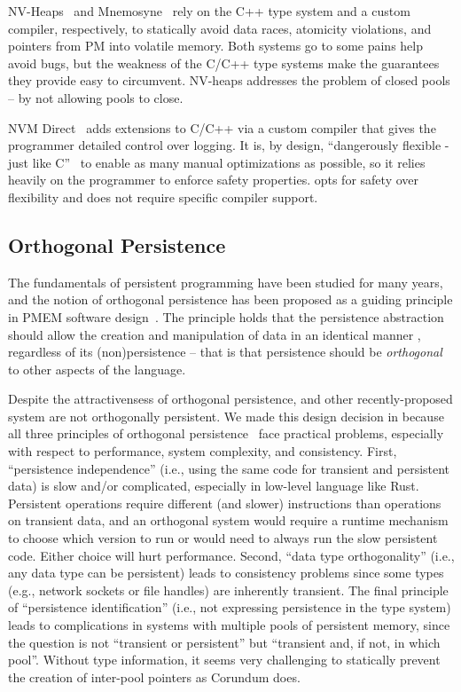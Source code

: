 NV-Heaps~\cite{nvheaps} and Mnemosyne~\cite{mnemosyne} rely on the C++ type system and a custom compiler, respectively, to statically avoid data races, atomicity violations, and pointers from PM into volatile memory.  Both systems go to some pains help avoid bugs, but the weakness of the C/C++ type systems make the guarantees they provide easy to circumvent.  NV-heaps addresses the problem of closed pools -- by not allowing pools to close.

NVM Direct~\cite{oracle-nvm-direct} adds extensions to C/C++ via a custom compiler that gives the programmer detailed control over logging.  It is, by design, ``dangerously flexible - just like C''~\cite{personalbillbridge} to enable as many manual optimizations as possible, so it relies heavily on the programmer to enforce safety properties.  \This{} opts for safety over flexibility and does not require specific compiler support.

\subsection{Orthogonal Persistence}

The fundamentals of persistent programming have been studied for many years,
and the notion of orthogonal persistence has been proposed as a guiding
principle in PMEM software design~\cite{atkinson1995orthogonally}.  The
principle holds that the persistence abstraction should allow the creation and
manipulation of data in an identical manner , regardless of its
(non)persistence -- that is that persistence should be \emph{orthogonal} to
other aspects of the language.


Despite the attractivensess of orthogonal persistence, \this{} and other
recently-proposed system are not orthogonally persistent.  We made this design
decision in \this{} because all three principles of orthogonal persistence~\cite{atkinson1995orthogonally} face practical
problems, especially with respect to performance, system complexity, and
consistency.  First, “persistence independence” (i.e., using the same code for
transient and persistent data) is slow and/or complicated, especially in
low-level language like Rust. Persistent operations require different (and
slower) instructions than operations on transient data, and an orthogonal
system would require a runtime mechanism to choose which version to run or
would need to always run the slow persistent code.  Either choice will hurt
performance.  Second, “data type orthogonality” (i.e., any data type can be persistent) leads to consistency problems
since some types (e.g., network sockets or file handles) are inherently
transient. The final principle of “persistence identification” (i.e., not
expressing persistence in the type system) leads to complications in systems
with multiple pools of persistent memory, since the question is not “transient
or persistent” but “transient and, if not, in which pool”.  Without type
information, it seems very challenging to statically prevent the creation of
inter-pool pointers as Corundum does.

